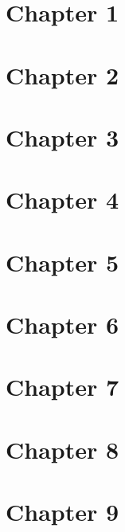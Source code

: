 \documentclass{article}
\theoremstyle{definition}
\begin{document}

\section{Chapter 1}





\section{Chapter 2}





\section{Chapter 3}

\newpage

\newpage

\newpage
\section{Chapter 4}




\section{Chapter 5}



\section{Chapter 6}







\section{Chapter 7}




\section{Chapter 8}


\section{Chapter 9}



\end{document}

